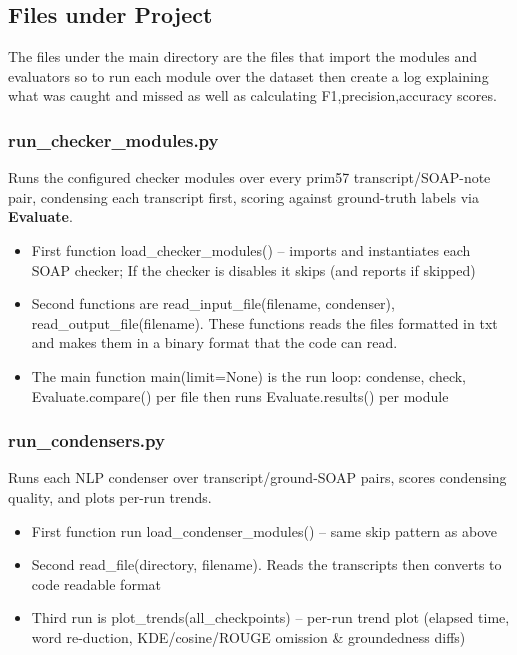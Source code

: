 \documentclass[11pt,a4paper]{article}
\begin{document}
\subsection{Files under Project}
The files under the main directory are the files that import the modules and evaluators so to run each module over the dataset then create a log explaining what was caught and missed as well as calculating F1,precision,accuracy scores.

\subsubsection{run\_checker\_modules.py}  Runs the configured checker modules over every prim57 transcript/SOAP-note pair, condensing each transcript first, scoring against ground-truth labels via \textbf{Evaluate}.

\begin{itemize}
    \item First function load\_checker\_modules() – imports and instantiates each SOAP checker; If the checker is disables it skips (and reports if skipped)
    \item Second functions are read\_input\_file(filename, condenser), read\_output\_file(filename). These functions reads the files formatted in txt and makes them in a binary format that the code can read.
    \item The main function main(limit=None) is the run loop: condense, check, Evaluate.compare() per file then runs Evaluate.results() per module
\end{itemize}


\subsubsection{run\_condensers.py} Runs each NLP condenser over transcript/ground-SOAP pairs, scores condensing quality, and plots per-run trends.

\begin{itemize}
    \item First function run load\_condenser\_modules() – same skip pattern as above
    \item Second read\_file(directory, filename). Reads the transcripts then converts to code readable format
    \item Third run is plot\_trends(all\_checkpoints) –  per-run trend plot (elapsed time, word re-duction, KDE/cosine/ROUGE omission \& groundedness diffs)
\end{itemize}
\end{document}
